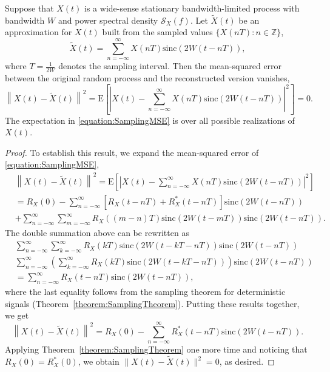 \begin{theorem} \label{theorem:SamplingRandomSignals}
Suppose that $X(t)$ is a wide-sense stationary bandwidth-limited process with bandwidth $W$ and power spectral density $\mathcal{S}_X (f)$.
Let $\tilde{X}(t)$ be an approximation for $X(t)$ built from the sampled values $\{ X(nT) : n \in \mathbb{Z} \}$,
\begin{equation*}
\tilde{X}(t) = \sum_{n=-\infty}^{\infty} X(nT) \mathrm{sinc} (2 W (t - nT)) ,
\end{equation*}
where $T = \frac{1}{2W}$ denotes the sampling interval.
Then the mean-squared error between the original random process and the reconstructed version vanishes,
\begin{equation} \label{equation:SamplingMSE}
\left\| X(t) - \tilde{X}(t) \right\|^2
= \mathrm{E} \left[ \left| X(t) - \sum_{n=-\infty}^{\infty}
X(nT) \mathrm{sinc} (2 W (t - nT)) \right|^2 \right] = 0 .
\end{equation}
The expectation in \eqref{equation:SamplingMSE} is over all possible realizations of $X(t)$.
\end{theorem}
\begin{proof}
To establish this result, we expand the mean-squared error of \eqref{equation:SamplingMSE},
\begin{equation*}
\begin{split}
&\left\| X(t) - \tilde{X}(t) \right\|^2
= \mathrm{E} \left[ \left| X(t) - \sum_{n=-\infty}^{\infty} X(nT)
\mathrm{sinc}(2 W (t - nT)) \right|^2 \right] \\
&= R_X(0) - \sum_{n=-\infty}^{\infty} [ R_X(t-nT) + R_X^*(t-nT) ]
\mathrm{sinc}(2 W (t - nT)) \\
&+ \sum_{n=-\infty}^{\infty} \sum_{m=-\infty}^{\infty} R_X((m-n)T)
\mathrm{sinc}(2 W (t - mT)) \mathrm{sinc}(2 W (t - nT)) .
\end{split}
\end{equation*}
The double summation above can be rewritten as
\begin{equation*}
\begin{split}
&\sum_{n=-\infty}^{\infty} \sum_{k=-\infty}^{\infty} R_X(kT)
\mathrm{sinc}(2 W (t - kT - nT)) \mathrm{sinc}(2 W (t - nT)) \\
&\sum_{n=-\infty}^{\infty} \left( \sum_{k=-\infty}^{\infty} R_X(kT)
\mathrm{sinc}(2 W (t - kT - nT)) \right) \mathrm{sinc}(2 W (t - nT)) \\
&= \sum_{n=-\infty}^{\infty} R_X(t - nT) \mathrm{sinc}(2 W (t - nT)) ,
\end{split}
\end{equation*}
where the last equality follows from the sampling theorem for deterministic signals (Theorem~\ref{theorem:SamplingTheorem}).
Putting these results together, we get
\begin{equation*}
\left\| X(t) - \tilde{X}(t) \right\|^2
= R_X(0) - \sum_{n=-\infty}^{\infty} R_X^*(t-nT) \mathrm{sinc}(2 W (t - nT)) .
\end{equation*}
Applying Theorem~\ref{theorem:SamplingTheorem} one more time and noticing that $R_X(0) = R_X^*(0)$, we obtain $\| X(t) - \tilde{X}(t) \|^2 = 0$, as desired.
\end{proof}

